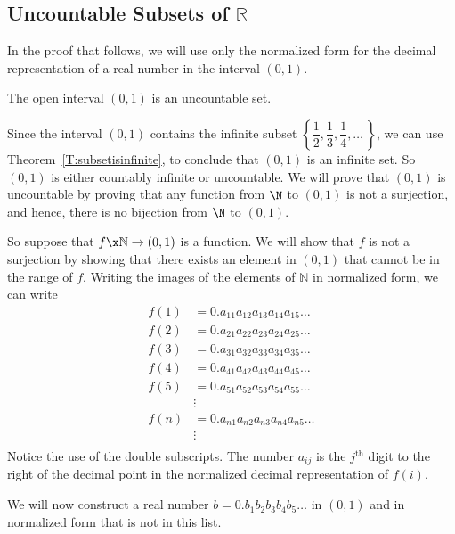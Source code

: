 \subsection*{Uncountable Subsets of $\boldsymbol{\mathbb{R}}$}
In the proof that follows, we will use only the normalized form for the decimal representation of a real number in the interval $( 0, 1 )$.
%
\begin{theorem}\label{T:uncountableinterval}
The open interval $( 0, 1 )$ is an uncountable set.
\end{theorem}
%
\begin{myproof}
Since the interval $( 0, 1 )$ contains the infinite subset 
$\left\{\dfrac{1}{2}, \dfrac{1}{3}, \dfrac{1}{4}, \ldots \,\right\}$, we can use 
Theorem~\ref{T:subsetisinfinite}, to conclude that $( 0, 1 )$ is an infinite set.  So $( 0, 1 )$ is either countably infinite or uncountable.  We will prove that $( 0, 1 )$ is uncountable by proving that any function from $\N$ to $(0, 1)$ is not a surjection, and hence, there is no bijection from $\N$ to  $(0, 1)$.

So suppose that $f\x \mathbb{N} \to ( 0, 1 )$ is a function.  We will show that $f$ is not a surjection by showing that there exists an element in 
$( 0, 1 )$ that cannot be in the range of $f$.  Writing the images of the elements of 
$\mathbb{N}$ in normalized form, we can write
\[
\begin{aligned}
f ( 1 ) &= 0.a_{1 1} a_{1 2} a_{1 3} a_{1 4} a_{1 5} \ldots \\
f ( 2 ) &= 0.a_{2 1} a_{2 2} a_{2 3} a_{2 4} a_{2 5} \ldots \\
f ( 3 ) &= 0.a_{3 1} a_{3 2} a_{3 3} a_{3 4} a_{3 5} \ldots \\
f ( 4 ) &= 0.a_{4 1} a_{4 2} a_{4 3} a_{4 4} a_{4 5} \ldots \\
f ( 5 ) &= 0.a_{5 1} a_{5 2} a_{5 3} a_{5 4} a_{5 5} \ldots \\
                   & \vdots \\
f ( n ) &= 0.a_{n 1} a_{n 2} a_{n 3} a_{n 4} a_{n 5} \ldots \\
                   & \vdots \\
\end{aligned}
\]
Notice the use of the double subscripts. The number $a_{i j}$ is the $j^\text{th}$ digit to the right of the decimal point in the normalized decimal representation of $f ( i )$.

We will now construct a real number $b = 0.b_1 b_2 b_3 b_4 b_5 \ldots$ in $( 0, 1 )$ and in normalized form that is not in this list.  


\end{myproof}
